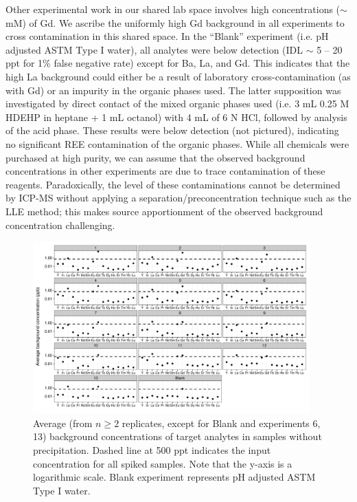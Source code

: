 Other experimental work in our shared lab space involves high concentrations ($\sim$mM) of Gd.
We ascribe the uniformly high Gd background in all experiments to cross contamination in this shared space.
In the ``Blank'' experiment (i.e. pH adjusted ASTM Type I water), all analytes were below detection (IDL $\sim$ 5 -- 20 ppt for 1\% false negative rate) except for Ba, La, and Gd. 
This indicates that the high La background could either be a result of laboratory cross-contamination (as with Gd) or an impurity in the organic phases used.
The latter supposition was investigated by direct contact of the mixed organic phases used (i.e. 3 mL 0.25 M HDEHP in heptane  + 1 mL octanol) with 4 mL of 6 N HCl, followed by analysis of the acid phase.
These results were below detection (not pictured), indicating no significant REE contamination of the organic phases.
While all chemicals were purchased at high purity, we can assume that the observed background concentrations in other experiments are due to trace contamination of these reagents.
Paradoxically, the level of these contaminations cannot be determined by ICP-MS without applying a separation/preconcentration technique such as the LLE method;
this makes source apportionment of the observed background concentration challenging.

\begin{figure}
\begin{center}
\includegraphics[width=0.95\textwidth]{Ch4_figures/REE-bkgd.pdf}
\caption{Average (from $n \geq 2$ replicates, except for Blank and experiments 6, 13) background concentrations of target analytes in samples without  precipitation.
Dashed line at 500 ppt indicates the input concentration for all spiked samples.
Note that the y-axis is a logarithmic scale. Blank experiment represents pH adjusted ASTM Type I water.}\label{fig:REE-bkgd}
\end{center}
\end{figure}

